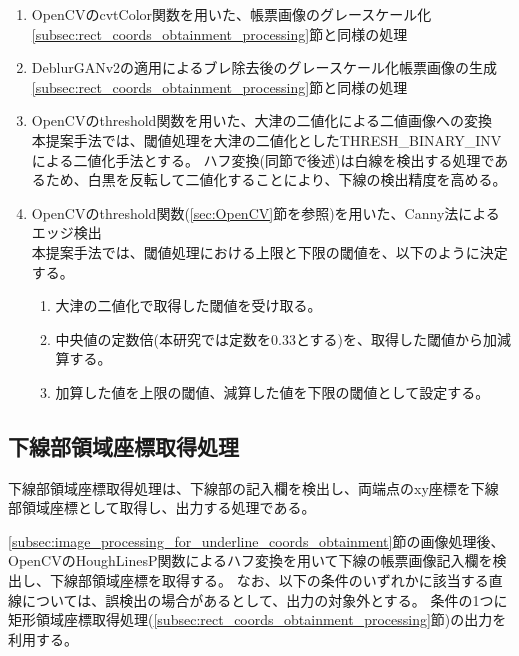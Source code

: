 \begin{enumerate}
    \item OpenCVのcvtColor関数を用いた、帳票画像のグレースケール化\\
        \ref{subsec:rect_coords_obtainment_processing}節と同様の処理
    \item DeblurGANv2の適用によるブレ除去後のグレースケール化帳票画像の生成\\
        \ref{subsec:rect_coords_obtainment_processing}節と同様の処理
    \item OpenCVのthreshold関数を用いた、大津の二値化による二値画像への変換\\
        本提案手法では、閾値処理を大津の二値化としたTHRESH\_BINARY\_INVによる二値化手法とする。
        ハフ変換(同節で後述)は白線を検出する処理であるため、白黒を反転して二値化することにより、下線の検出精度を高める。
    \item OpenCVのthreshold関数(\ref{sec:OpenCV}節を参照)を用いた、Canny法によるエッジ検出\\
        本提案手法では、閾値処理における上限と下限の閾値を、以下のように決定する。
        \begin{enumerate}
            \item 大津の二値化で取得した閾値を受け取る。
            \item 中央値の定数倍(本研究では定数を0.33とする)を、取得した閾値から加減算する。
            \item 加算した値を上限の閾値、減算した値を下限の閾値として設定する。
        \end{enumerate}
\end{enumerate}


\subsection{下線部領域座標取得処理}\label{subsec:underline_coords_obtainment_processing}
下線部領域座標取得処理は、下線部の記入欄を検出し、両端点のxy座標を下線部領域座標として取得し、出力する処理である。

\ref{subsec:image_processing_for_underline_coords_obtainment}節の画像処理後、OpenCVのHoughLinesP関数によるハフ変換を用いて下線の帳票画像記入欄を検出し、下線部領域座標を取得する。
なお、以下の条件のいずれかに該当する直線については、誤検出の場合があるとして、出力の対象外とする。
条件の1つに矩形領域座標取得処理(\ref{subsec:rect_coords_obtainment_processing}節)の出力を利用する。

